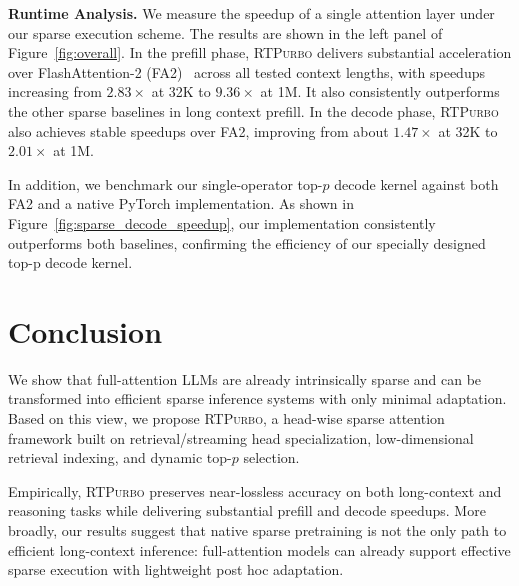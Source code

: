 \documentclass{llmxive}
\providecommand{\name}{{\textsc{RTPurbo}}\xspace}
\providecommand{\zyk}[1]{zyk: #1}
\begin{document}

\noindent\textbf{Runtime Analysis.} We measure the speedup of a single attention layer under our sparse execution scheme. The results are shown in the left panel of Figure~\ref{fig:overall}. In the prefill phase, \name delivers substantial acceleration over FlashAttention-2 (FA2)~\citep{dao2024flashattention} across all tested context lengths, with speedups increasing from $2.83\times$ at 32K to $9.36\times$ at 1M. It also consistently outperforms the other sparse baselines in long context prefill. In the decode phase, \name also achieves stable speedups over FA2, improving from about $1.47\times$ at 32K to $2.01\times$ at 1M. 

In addition, we benchmark our single-operator top-$p$ decode kernel against both FA2 and a native PyTorch implementation. As shown in Figure~\ref{fig:sparse_decode_speedup}, our implementation consistently outperforms both baselines, confirming the efficiency of our specially designed top-p decode kernel.


\section{Conclusion}

We show that full-attention LLMs are already intrinsically sparse and can be transformed into efficient sparse inference systems with only minimal adaptation. Based on this view, we propose \name, a head-wise sparse attention framework built on retrieval/streaming head specialization, low-dimensional retrieval indexing, and dynamic top-$p$ selection.

Empirically, \name preserves near-lossless accuracy on both long-context and reasoning tasks while delivering substantial prefill and decode speedups. More broadly, our results suggest that native sparse pretraining is not the only path to efficient long-context inference: full-attention models can already support effective sparse execution with lightweight post hoc adaptation.
\end{document}
